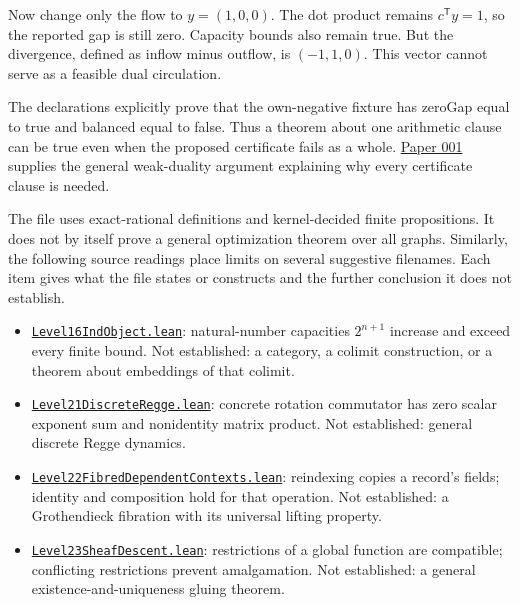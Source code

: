 \documentclass[
  11pt,
]{article}
\providecommand{\tightlist}{%
  \setlength{\itemsep}{0pt}\setlength{\parskip}{0pt}}
\begin{document}
Now change only the flow to \(y=(1,0,0)\). The dot product remains
\(c^\mathsf{T}y=1\), so the reported gap is still zero. Capacity bounds
also remain true. But the divergence, defined as inflow minus outflow,
is \((-1,1,0)\). This vector cannot serve as a feasible dual
circulation.

The declarations explicitly prove that the own-negative fixture has
zeroGap equal to true and balanced equal to false. Thus a theorem about
one arithmetic clause can be true even when the proposed certificate
fails as a whole.
\href{https://github.com/dbccpage/the_symbol_game/blob/23893fc44162555fa12ceda3e1665982e3d7a14e/omega_engine_atlas/coda_atlas/omega_engine_symbol_game/001_pfp_discrete_cochain_retraction_and_toy_involutions/paper.md}{Paper
001} supplies the general weak-duality argument explaining why every
certificate clause is needed.

The file uses exact-rational definitions and kernel-decided finite
propositions. It does not by itself prove a general optimization theorem
over all graphs. Similarly, the following source readings place limits
on several suggestive filenames. Each item gives what the file states or
constructs and the further conclusion it does not establish.

\begin{itemize}
\tightlist
\item
  \href{https://github.com/dbccpage/the_symbol_game/blob/52cb5457f6c485ba548cfd292f6012a941ed22cf/lean4/Level16IndObject.lean}{\mbox{\nolinkurl{Level16IndObject.lean}}}:
  natural-number capacities \(2^{n+1}\) increase and exceed every finite
  bound. Not established: a category, a colimit construction, or a
  theorem about embeddings of that colimit.
\item
  \href{https://github.com/dbccpage/the_symbol_game/blob/52cb5457f6c485ba548cfd292f6012a941ed22cf/lean4/Level21DiscreteRegge.lean}{\mbox{\nolinkurl{Level21DiscreteRegge.lean}}}:
  concrete rotation commutator has zero scalar exponent sum and
  nonidentity matrix product. Not established: general discrete Regge
  dynamics.
\item
  \href{https://github.com/dbccpage/the_symbol_game/blob/52cb5457f6c485ba548cfd292f6012a941ed22cf/lean4/Level22FibredDependentContexts.lean}{\mbox{\nolinkurl{Level22FibredDependentContexts.lean}}}:
  reindexing copies a record's fields; identity and composition hold for
  that operation. Not established: a Grothendieck fibration with its
  universal lifting property.
\item
  \href{https://github.com/dbccpage/the_symbol_game/blob/52cb5457f6c485ba548cfd292f6012a941ed22cf/lean4/Level23SheafDescent.lean}{\mbox{\nolinkurl{Level23SheafDescent.lean}}}:
  restrictions of a global function are compatible; conflicting
  restrictions prevent amalgamation. Not established: a general
  existence-and-uniqueness gluing theorem.
\end{itemize}
\end{document}
